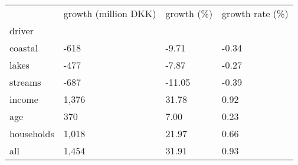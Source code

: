 \begin{tabular}{llll}
\toprule
 & growth (million DKK) & growth (\%) & growth rate (\%) \\
driver &  &  &  \\
\midrule
coastal & -618 & -9.71 & -0.34 \\
lakes & -477 & -7.87 & -0.27 \\
streams & -687 & -11.05 & -0.39 \\
income & 1,376 & 31.78 & 0.92 \\
age & 370 & 7.00 & 0.23 \\
households & 1,018 & 21.97 & 0.66 \\
all & 1,454 & 31.91 & 0.93 \\
\bottomrule
\end{tabular}
